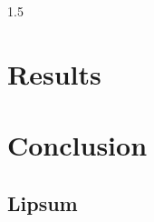\documentclass[12pt, a4paper, oneside]{book}
\begin{document}
\begin{spacing}{1.5}
		\chapter{Results}
		\label{chap:Results}
		\lipsum[9]
		\chapter{Conclusion}
		\label{chap:Conclusion}
		\lipsum[10]
		\begin{singlespace}
			\clearpage
			\renewcommand{\bibname}{References}

			
			\clearpage
		\end{singlespace}
		\begin{appendices}
			\chapter{Lipsum}
			\lipsum[11]
		\end{appendices}
		\backmatter
	\end{spacing}
\end{document}

